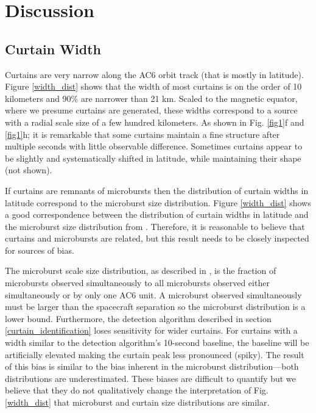 \documentclass[draft]{agujournal2019}
\begin{document}
\section{Discussion} \label{discussion}
\subsection{Curtain Width}
Curtains are very narrow along the AC6 orbit track (that is mostly in latitude). Figure \ref{width_dist} shows that the width of most curtains is on the order of 10 kilometers and 90\% are narrower than 21 km. Scaled to the magnetic equator, where we presume curtains are generated, these widths correspond to a source with a radial scale size of a few hundred kilometers. As shown in Fig. \ref{fig1}f and \ref{fig1}h; it is remarkable that some curtains maintain a fine structure after multiple seconds with little observable difference. Sometimes curtains appear to be slightly and systematically shifted in latitude, while maintaining their shape (not shown).

If curtains are remnants of microbursts then the distribution of curtain widths in latitude correspond to the microburst size distribution. Figure \ref{width_dist} shows a good correspondence between the distribution of curtain widths in latitude and the microburst size distribution from . Therefore, it is reasonable to believe that curtains and microbursts are related, but this result needs to be closely inspected for sources of bias. 

The microburst scale size distribution, as described in , is the fraction of microbursts observed simultaneously to all microbursts observed either simultaneously or by only one AC6 unit. A microburst observed simultaneously must be larger than the spacecraft separation so the microburst distribution is a lower bound. Furthermore, the detection algorithm described in section \ref{curtain_identification} loses sensitivity for wider curtains. For curtains with a width similar to the detection algorithm’s 10-second baseline, the baseline will be artificially elevated making the curtain peak less pronounced (spiky).
The result of this bias is similar to the bias inherent in the microburst distribution---both distributions are underestimated. These biases are difficult to quantify but we believe that they do not qualitatively change the interpretation of Fig. \ref{width_dist} that microburst and curtain size distributions are similar.
\end{document}
